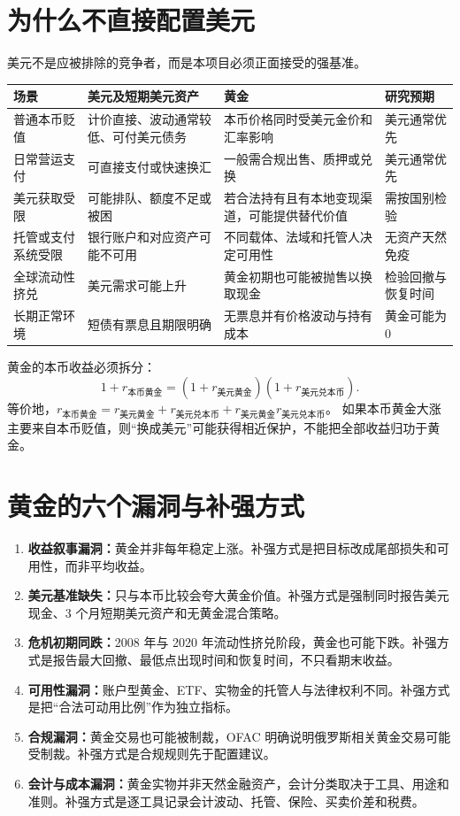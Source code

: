 \documentclass[UTF8,12pt,openany]{ctexbook}
\begin{document}
\section{为什么不直接配置美元}
美元不是应被排除的竞争者，而是本项目必须正面接受的强基准。

\begin{longtable}{p{3.0cm}p{4.3cm}p{4.3cm}p{2.4cm}}
\toprule
\textbf{场景} & \textbf{美元及短期美元资产} & \textbf{黄金} & \textbf{研究预期}\\
\midrule
普通本币贬值 & 计价直接、波动通常较低、可付美元债务 & 本币价格同时受美元金价和汇率影响 & 美元通常优先\\
日常营运支付 & 可直接支付或快速换汇 & 一般需合规出售、质押或兑换 & 美元通常优先\\
美元获取受限 & 可能排队、额度不足或被困 & 若合法持有且有本地变现渠道，可能提供替代价值 & 需按国别检验\\
托管或支付系统受限 & 银行账户和对应资产可能不可用 & 不同载体、法域和托管人决定可用性 & 无资产天然免疫\\
全球流动性挤兑 & 美元需求可能上升 & 黄金初期也可能被抛售以换取现金 & 检验回撤与恢复时间\\
长期正常环境 & 短债有票息且期限明确 & 无票息并有价格波动与持有成本 & 黄金可能为 0\\
\bottomrule
\end{longtable}

黄金的本币收益必须拆分：
\begin{equation}
1+r_{\text{本币黄金}}
=
(1+r_{\text{美元黄金}})(1+r_{\text{美元兑本币}}).
\end{equation}
等价地，\(r_{\text{本币黄金}}=r_{\text{美元黄金}}+r_{\text{美元兑本币}}+r_{\text{美元黄金}}r_{\text{美元兑本币}}\)。
如果本币黄金大涨主要来自本币贬值，则“换成美元”可能获得相近保护，不能把全部收益归功于黄金。

\section{黄金的六个漏洞与补强方式}
\begin{enumerate}
  \item \textbf{收益叙事漏洞：}黄金并非每年稳定上涨。补强方式是把目标改成尾部损失和可用性，而非平均收益。
  \item \textbf{美元基准缺失：}只与本币比较会夸大黄金价值。补强方式是强制同时报告美元现金、3 个月短期美元资产和无黄金混合策略。
  \item \textbf{危机初期同跌：}2008 年与 2020 年流动性挤兑阶段，黄金也可能下跌。补强方式是报告最大回撤、最低点出现时间和恢复时间，不只看期末收益。
  \item \textbf{可用性漏洞：}账户型黄金、ETF、实物金的托管人与法律权利不同。补强方式是把“合法可动用比例”作为独立指标。
  \item \textbf{合规漏洞：}黄金交易也可能被制裁，OFAC 明确说明俄罗斯相关黄金交易可能受制裁\autocite{ofac1029}。补强方式是合规规则先于配置建议。
  \item \textbf{会计与成本漏洞：}黄金实物并非天然金融资产，会计分类取决于工具、用途和准则\autocite{ifrscommodity2016,ifrsias2}。补强方式是逐工具记录会计波动、托管、保险、买卖价差和税费。
\end{enumerate}
\end{document}
